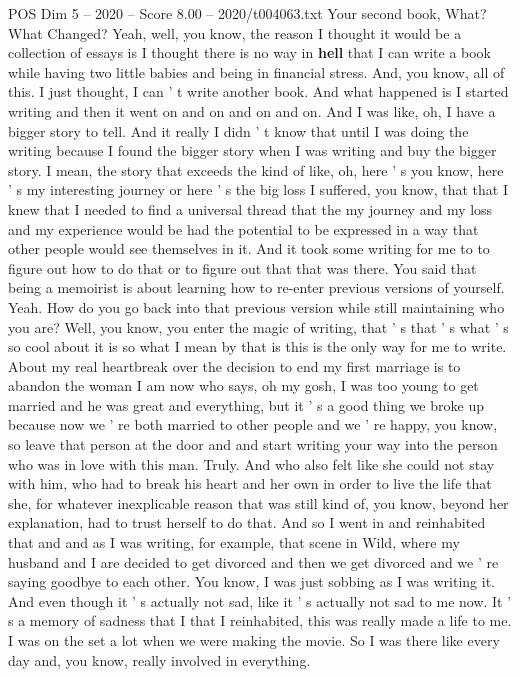 \begin{textsample}{POS Dim 5 – 2020 – Score 8.00 – 2020/t004063.txt}
Your second book, What?
What Changed?
Yeah, well, you know, the reason I thought it would be a collection of essays is I thought there is no way in \textbf{hell} that I can write a book while having two little babies and being in financial stress.
And, you know, all of this.
I just thought, I can ' t write another book.
And what happened is I started writing and then it went on and on and on and on.
And I was like, oh, I have a bigger story to tell.
And it really I didn ' t know that until I was doing the writing because I found the bigger story when I was writing and buy the bigger story.
I mean, the story that exceeds the kind of like, oh, here ' s you know, here ' s my interesting journey or here ' s the big loss I suffered, you know, that that I knew that I needed to find a universal thread that the my journey and my loss and my experience would be had the potential to be expressed in a way that other people would see themselves in it.
And it took some writing for me to to figure out how to do that or to figure out that that was there.
You said that being a memoirist is about learning how to re-enter previous versions of yourself.
Yeah.
How do you go back into that previous version while still maintaining who you are?
Well, you know, you enter the magic of writing, that ' s that ' s what ' s so cool about it is so what I mean by that is this is the only way for me to write.
About my real heartbreak over the decision to end my first marriage is to abandon the woman I am now who says, oh my gosh, I was too young to get married and he was great and everything, but it ' s a good thing we broke up because now we ' re both married to other people and we ' re happy, you know, so leave that person at the door and and start writing your way into the person who was in love with this man.
Truly.
And who also felt like she could not stay with him, who had to break his heart and her own in order to live the life that she, for whatever inexplicable reason that was still kind of, you know, beyond her explanation, had to trust herself to do that.
And so I went in and reinhabited that and and as I was writing, for example, that scene in Wild, where my husband and I are decided to get divorced and then we get divorced and we ' re saying goodbye to each other.
You know, I was just sobbing as I was writing it.
And even though it ' s actually not sad, like it ' s actually not sad to me now.
It ' s a memory of sadness that I that I reinhabited, this was really made a life to me.
I was on the set a lot when we were making the movie.
So I was there like every day and, you know, really involved in everything.

\end{textsample}
